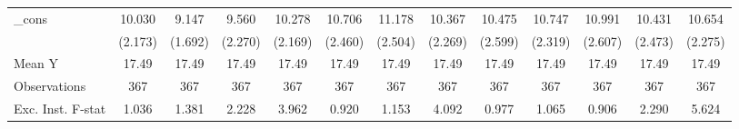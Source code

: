 {\begin{tabular}{l*{12}{c}}
\addlinespace
\_cons      &      10.030\sym{***}&       9.147\sym{***}&       9.560\sym{***}&      10.278\sym{***}&      10.706\sym{***}&      11.178\sym{***}&      10.367\sym{***}&      10.475\sym{***}&      10.747\sym{***}&      10.991\sym{***}&      10.431\sym{***}&      10.654\sym{***}\\
            &     (2.173)         &     (1.692)         &     (2.270)         &     (2.169)         &     (2.460)         &     (2.504)         &     (2.269)         &     (2.599)         &     (2.319)         &     (2.607)         &     (2.473)         &     (2.275)         \\
\midrule
Mean Y      &       17.49         &       17.49         &       17.49         &       17.49         &       17.49         &       17.49         &       17.49         &       17.49         &       17.49         &       17.49         &       17.49         &       17.49         \\
Observations&         367         &         367         &         367         &         367         &         367         &         367         &         367         &         367         &         367         &         367         &         367         &         367         \\
Exc. Inst. F-stat&       1.036         &       1.381         &       2.228         &       3.962         &       0.920         &       1.153         &       4.092         &       0.977         &       1.065         &       0.906         &       2.290         &       5.624         \\
\bottomrule
\end{tabular}
}
